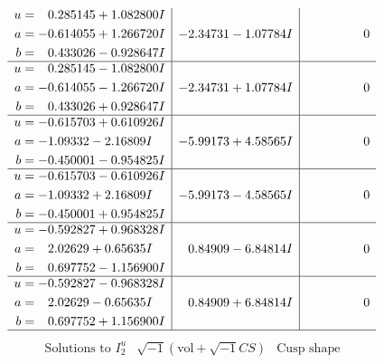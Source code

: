 \documentclass[1p]{elsarticle_modified}
\theoremstyle{definition}
\newcommand{\I}{\sqrt{-1}}
\begin{document}
$$\begin{array}{c|c|c}
\begin{aligned}
u &= \phantom{-}0.285145 + 1.082800 I \\
a &= -0.614055 + 1.266720 I \\
b &= \phantom{-}0.433026 - 0.928647 I\end{aligned}
 & -2.34731 - 1.07784 I & \phantom{-0.000000 } 0 \\ \hline\begin{aligned}
u &= \phantom{-}0.285145 - 1.082800 I \\
a &= -0.614055 - 1.266720 I \\
b &= \phantom{-}0.433026 + 0.928647 I\end{aligned}
 & -2.34731 + 1.07784 I & \phantom{-0.000000 } 0 \\ \hline\begin{aligned}
u &= -0.615703 + 0.610926 I \\
a &= -1.09332 - 2.16809 I \\
b &= -0.450001 - 0.954825 I\end{aligned}
 & -5.99173 + 4.58565 I & \phantom{-0.000000 } 0 \\ \hline\begin{aligned}
u &= -0.615703 - 0.610926 I \\
a &= -1.09332 + 2.16809 I \\
b &= -0.450001 + 0.954825 I\end{aligned}
 & -5.99173 - 4.58565 I & \phantom{-0.000000 } 0 \\ \hline\begin{aligned}
u &= -0.592827 + 0.968328 I \\
a &= \phantom{-}2.02629 + 0.65635 I \\
b &= \phantom{-}0.697752 - 1.156900 I\end{aligned}
 & \phantom{-}0.84909 - 6.84814 I & \phantom{-0.000000 } 0 \\ \hline\begin{aligned}
u &= -0.592827 - 0.968328 I \\
a &= \phantom{-}2.02629 - 0.65635 I \\
b &= \phantom{-}0.697752 + 1.156900 I\end{aligned}
 & \phantom{-}0.84909 + 6.84814 I & \phantom{-0.000000 } 0\\
 \hline 
 \end{array}$$\newpage$$\begin{array}{c|c|c}  
\text{Solutions to }I^u_{2}& \I (\text{vol} + \sqrt{-1}CS) & \text{Cusp shape}\\
 \hline 
\begin{aligned}

\end{aligned}
\end{array}$$
\end{document}
